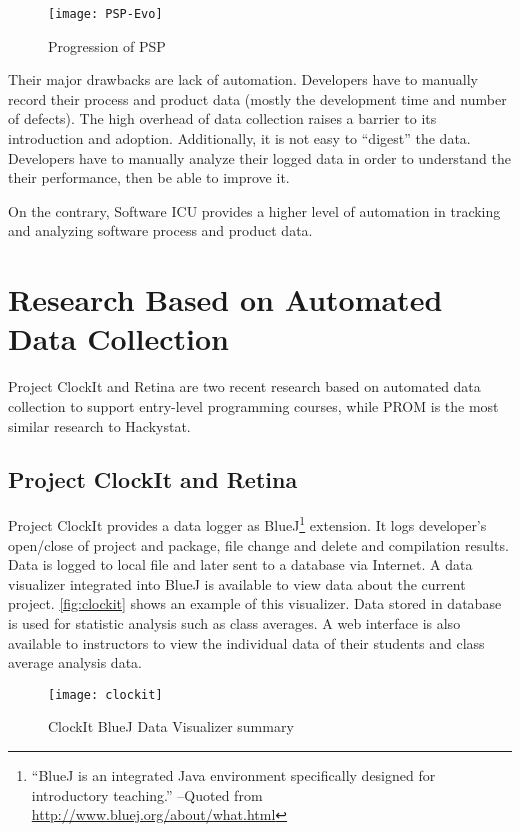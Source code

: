 \begin{figure}[htbp] %
   \centering
   \texttt{[image: PSP-Evo]} 
   \caption{Progression of PSP}
   \label{fig:PSP-Evo}
\end{figure}


Their major drawbacks are lack of automation. Developers have to manually record their process and product data (mostly the development time and number of defects). The high overhead of data collection raises a barrier to its introduction and adoption. Additionally, it is not easy to ``digest'' the data. Developers have to manually analyze their logged data in order to understand the their performance, then be able to improve it.

On the contrary, Software ICU provides a higher level of automation in tracking and analyzing software process and product data.


\section {Research Based on Automated Data Collection}
Project ClockIt and Retina are two recent research based on automated data collection to support entry-level programming courses, while PROM is the most similar research to Hackystat.

\subsection {Project ClockIt and Retina}
Project ClockIt provides a data logger as BlueJ\footnote{``BlueJ is an integrated Java environment specifically designed for introductory teaching.'' --Quoted from \url{http://www.bluej.org/about/what.html}}
 extension. It logs developer's open/close of project and package, file change and delete and compilation results. Data is logged to local file and later sent to a database via Internet. A data visualizer integrated into BlueJ is available to view data about the current project. \autoref{fig:clockit} shows an example of this visualizer. Data stored in database is used for statistic analysis such as class averages. A web interface is also available to instructors to view the individual data of their students and class average analysis data.

\begin{figure}[htbp] %
   \centering
   \texttt{[image: clockit]} 
   \caption{ClockIt BlueJ Data Visualizer summary}
   \label{fig:clockit}
\end{figure}

